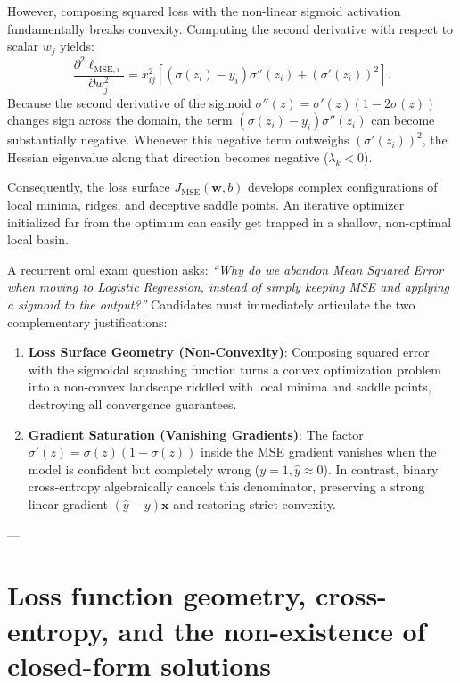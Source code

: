 However, composing squared loss with the non-linear sigmoid activation fundamentally breaks convexity. Computing the second derivative with respect to scalar $w_j$ yields:
\begin{equation}
\frac{\partial^2 \ell_{\text{MSE}, i}}{\partial w_j^2} = x_{ij}^2 \left[ (\sigma(z_i) - y_i) \sigma''(z_i) + (\sigma'(z_i))^2 \right].
\end{equation}
Because the second derivative of the sigmoid $\sigma''(z) = \sigma'(z)(1 - 2\sigma(z))$ changes sign across the domain, the term $(\sigma(z_i) - y_i)\sigma''(z_i)$ can become substantially negative. Whenever this negative term outweighs $(\sigma'(z_i))^2$, the Hessian eigenvalue along that direction becomes negative ($\lambda_k < 0$). 

Consequently, the loss surface $J_{\text{MSE}}(\mathbf{w}, b)$ develops complex configurations of local minima, ridges, and deceptive saddle points. An iterative optimizer initialized far from the optimum can easily get trapped in a shallow, non-optimal local basin.

\begin{examinsight}
A recurrent oral exam question asks: \emph{``Why do we abandon Mean Squared Error when moving to Logistic Regression, instead of simply keeping MSE and applying a sigmoid to the output?''}
Candidates must immediately articulate the two complementary justifications:
\begin{enumerate}[noitemsep]
  \item \textbf{Loss Surface Geometry (Non-Convexity)}: Composing squared error with the sigmoidal squashing function turns a convex optimization problem into a non-convex landscape riddled with local minima and saddle points, destroying all convergence guarantees.
  \item \textbf{Gradient Saturation (Vanishing Gradients)}: The factor $\sigma'(z) = \sigma(z)(1-\sigma(z))$ inside the MSE gradient vanishes when the model is confident but completely wrong ($y=1, \hat{y} \approx 0$). In contrast, binary cross-entropy algebraically cancels this denominator, preserving a strong linear gradient $(\hat{y} - y)\mathbf{x}$ and restoring strict convexity.
\end{enumerate}
\end{examinsight}

---

\section{Loss function geometry, cross-entropy, and the non-existence of closed-form solutions}
\label{sec:loss_geometry_and_cross_entropy}


